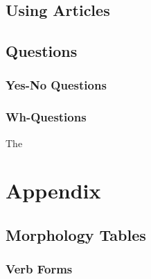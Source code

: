 \documentclass[oneside]{book}
\begin{document}
\chapter{Using Articles}

\chapter{Questions}
\section{Yes-No Questions}
\section{Wh-Questions}





The 

\newpage
\appendix
\part{Appendix}
\chapter{Morphology Tables}
\section{Verb Forms}
\end{document}
